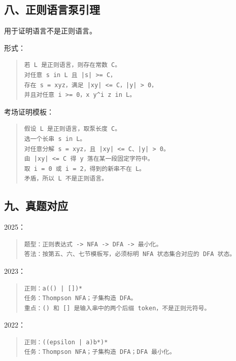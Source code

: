\documentclass[UTF8,zihao=-4]{ctexart}
\begin{document}
\subsection{八、正则语言泵引理}


用于证明语言不是正则语言。


形式：


\begin{quote}
\footnotesize
\begin{verbatim}
若 L 是正则语言，则存在常数 C。
对任意 s in L 且 |s| >= C，
存在 s = xyz，满足 |xy| <= C，|y| > 0，
并且对任意 i >= 0，x y^i z in L。
\end{verbatim}
\end{quote}


考场证明模板：


\begin{quote}
\footnotesize
\begin{verbatim}
假设 L 是正则语言，取泵长度 C。
选一个长串 s in L。
对任意分解 s = xyz，且 |xy| <= C、|y| > 0。
由 |xy| <= C 得 y 落在某一段固定字符中。
取 i = 0 或 i = 2，得到的新串不在 L。
矛盾，所以 L 不是正则语言。
\end{verbatim}
\end{quote}


\subsection{九、真题对应}


2025：


\begin{quote}
\footnotesize
\begin{verbatim}
题型：正则表达式 -> NFA -> DFA -> 最小化。
答法：按第五、六、七节模板写，必须标明 NFA 状态集合对应的 DFA 状态。
\end{verbatim}
\end{quote}


2023：


\begin{quote}
\footnotesize
\begin{verbatim}
正则：a(() | [])*
任务：Thompson NFA；子集构造 DFA。
重点：() 和 [] 是输入串中的两个后缀 token，不是正则元符号。
\end{verbatim}
\end{quote}


2022：


\begin{quote}
\footnotesize
\begin{verbatim}
正则：((epsilon | a)b*)*
任务：Thompson NFA；子集构造 DFA；DFA 最小化。
\end{verbatim}
\end{quote}
\end{document}
